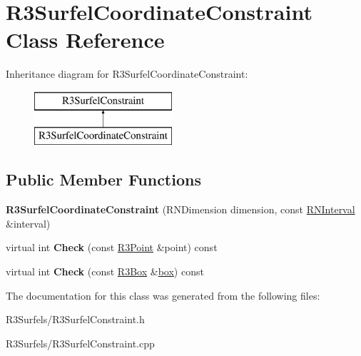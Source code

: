 \hypertarget{class_r3_surfel_coordinate_constraint}{}\section{R3\+Surfel\+Coordinate\+Constraint Class Reference}
\label{class_r3_surfel_coordinate_constraint}
Inheritance diagram for R3\+Surfel\+Coordinate\+Constraint\+:\begin{figure}[H]
\begin{center}
\leavevmode
\includegraphics[height=2.000000cm]{class_r3_surfel_coordinate_constraint}
\end{center}
\end{figure}
\subsection*{Public Member Functions}
\begin{DoxyCompactItemize}
\item 
{\bfseries R3\+Surfel\+Coordinate\+Constraint} (R\+N\+Dimension dimension, const \hyperlink{class_r_n_interval}{R\+N\+Interval} \&interval)\hypertarget{class_r3_surfel_coordinate_constraint_a2ea8b4fd96b2ff8c4e28f07ec5423c8e}{}\label{class_r3_surfel_coordinate_constraint_a2ea8b4fd96b2ff8c4e28f07ec5423c8e}

\item 
virtual int {\bfseries Check} (const \hyperlink{class_r3_point}{R3\+Point} \&point) const \hypertarget{class_r3_surfel_coordinate_constraint_a00ffa7b6b9fe4d0f7ee57ce40eb3d856}{}\label{class_r3_surfel_coordinate_constraint_a00ffa7b6b9fe4d0f7ee57ce40eb3d856}

\item 
virtual int {\bfseries Check} (const \hyperlink{class_r3_box}{R3\+Box} \&\hyperlink{structbox}{box}) const \hypertarget{class_r3_surfel_coordinate_constraint_a04ce1992ed2c2b1c24926c2807c7e063}{}\label{class_r3_surfel_coordinate_constraint_a04ce1992ed2c2b1c24926c2807c7e063}

\end{DoxyCompactItemize}


The documentation for this class was generated from the following files\+:\begin{DoxyCompactItemize}
\item 
R3\+Surfels/R3\+Surfel\+Constraint.\+h\item 
R3\+Surfels/R3\+Surfel\+Constraint.\+cpp\end{DoxyCompactItemize}
